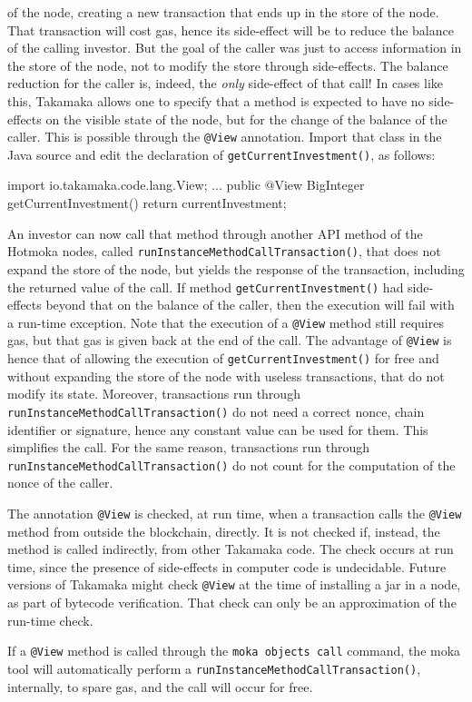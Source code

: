 of the node, creating a new transaction that ends up in
the store of the node. That transaction will cost gas, hence its side-effect will
be to reduce the balance of the calling investor. But the goal of the caller
was just to access information in the store of the node, not to modify the store through
side-effects. The balance reduction for the caller is, indeed, the \emph{only}
side-effect of that call! In cases like this, Takamaka allows one to
specify that a method is expected to have no side-effects on the visible
state of the node, but for the change of the balance of the caller.
This is possible through the \texttt{@View} annotation. Import that
class in the Java source and edit the declaration of \texttt{getCurrentInvestment()},
as follows:
%
\begin{codebox}\begin{javalst}
import io.takamaka.code.lang.View;
...
public @View BigInteger getCurrentInvestment() {
  return currentInvestment;
}
\end{javalst}\end{codebox}
%
An investor can now call that method through another API method of the Hotmoka
nodes, called \texttt{runInstanceMethodCallTransaction()},
that does not expand the
store of the node, but yields the response of the transaction, including the
returned value of the call. If method
\texttt{getCurrentInvestment()} had side-effects beyond that on the balance of
the caller, then the execution will fail with a run-time exception.
Note that the execution of a \texttt{@View} method still requires gas,
but that gas is given back at the end of the call.
The advantage of \texttt{@View} is hence that of allowing the execution
of \texttt{getCurrentInvestment()} for free and without expanding the store of the node
with useless transactions, that do not modify its state. Moreover,
transactions run through \texttt{runInstanceMethodCallTransaction()} do not need
a correct nonce, chain identifier or signature,
hence any constant value can be used for them.
This simplifies the call. For the same reason, transactions run
through \texttt{runInstanceMethodCallTransaction()} do not count for the computation of
the nonce of the caller.
%
\begin{commentbox}
The annotation \texttt{@View} is checked, at run time, when a transaction calls the
\texttt{@View} method from outside the blockchain, directly. It is not checked if,
instead, the method is called indirectly, from other Takamaka code.
The check occurs at run time, since the presence of side-effects in
computer code is undecidable. Future versions of Takamaka might check
\texttt{@View} at the time of installing a jar in a node, as part of
bytecode verification. That check can only be an approximation of the run-time check.
\end{commentbox}
%
\begin{commentbox}
  If a \texttt{@View} method is called through the \texttt{moka objects call} command,
  the moka tool will automatically perform a \texttt{runInstanceMethodCallTransaction()},
  internally, to spare gas, and the call will occur for free.
\end{commentbox}

